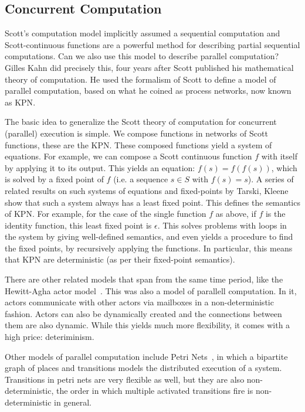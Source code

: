 \subsection{Concurrent Computation}
Scott's computation model implicitly assumed a sequential computation and Scott-continuous functions are a powerful method for describing partial sequential computations.
Can we also use this model to describe parallel computation?
Gilles Kahn did precisely this, four years after Scott published his mathematical theory of computation. 
He used the formalism of Scott to define a model of parallel computation, based on what he coined as process networks, now known as \acf{KPN}\cite{kahn74}.

The basic idea to generalize the Scott theory of computation for concurrent (parallel) execution is simple.
We compose functions in networks of Scott functions, these are the \ac{KPN}.
These composed functions yield a system of equations.
For example, we can compose a Scott continuous function $f$ with itself by applying it to its output.
This yields an equation: $f(s) = f(f(s))$, which is solved by a fixed point of $f$ (i.e. a sequence $s \in S$ with $f(s)= s$).
A series of related results on such systems of equations and fixed-points by Tarski, Kleene show that such a system always has a least fixed point.
This defines the semantics of \ac{KPN}.
For example, for the case of the single function $f$ as above, if $f$ is the identity function, this least fixed point is $\epsilon$.
This solves problems with loops in the system by giving well-defined semantics, and even yields a procedure to find the fixed points, by recursively applying the functions.
In particular, this means that \ac{KPN} are deterministic (as per their fixed-point semantics).

There are other related models that span from the same time period, like the Hewitt-Agha actor model~\cite{DBLP:conf/ijcai/HewittBS73,Agha:86:Actors}.
This was also a model of parallell computation. In it, actors communicate with other actors via mailboxes in a non-deterministic fashion. 
Actors can also be dynamically created and the connections between them are also dynamic.
While this yields much more flexibility, it comes with a high price: deteriminism. 

Other models of parallel computation include Petri Nets~\cite{petri1962nets}, in which a bipartite graph of places and transitions models the distributed execution of a system.
Transitions in petri nets are very flexible as well, but they are also non-deterministic, the order in which multiple activated transitions fire is non-deterministic in general.

